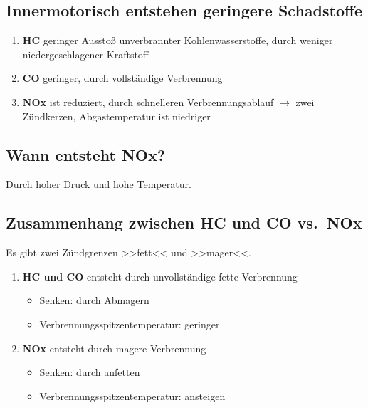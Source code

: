 \subsection{Innermotorisch entstehen geringere
Schadstoffe}\label{innermotorisch-entstehen-geringere-schadstoffe}

\begin{enumerate}
\item
  \textbf{HC} geringer Ausstoß unverbrannter Kohlenwasserstoffe, durch
  weniger niedergeschlagener Kraftstoff
\item
  \textbf{CO} geringer, durch vollständige Verbrennung
\item
  \textbf{NOx} ist reduziert, durch schnelleren Verbrennungsablauf
  $\to$ zwei Zündkerzen, Abgastemperatur ist niedriger
\end{enumerate}

\subsection{Wann entsteht NOx?}\label{wann-entsteht-nox}

Durch hoher Druck und hohe Temperatur.

\subsection{Zusammenhang zwischen HC und CO
vs.~NOx}\label{zusammenhang-zwischen-hc-und-co-vs.-nox}

Es gibt zwei Zündgrenzen >>fett<< und >>mager<<.

\begin{enumerate}
\item
  \textbf{HC und CO} entsteht durch unvollständige fette Verbrennung

  \begin{itemize}
  \item
    Senken: durch Abmagern
  \item
    Verbrennungsspitzentemperatur: geringer
  \end{itemize}
\item
  \textbf{NOx} entsteht durch magere Verbrennung

  \begin{itemize}
  \item
    Senken: durch anfetten
  \item
    Verbrennungsspitzentemperatur: ansteigen
  \end{itemize}
\end{enumerate}

